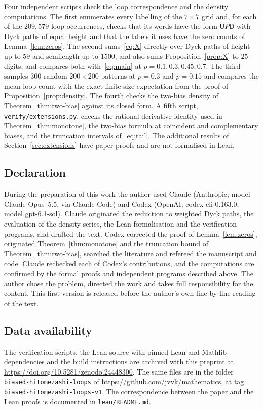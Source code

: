 \documentclass[11pt]{amsart}
\theoremstyle{definition}
\theoremstyle{remark}
\newcommand{\U}{\mathsf{U}}
\newcommand{\D}{\mathsf{D}}
\begin{document}
Four independent scripts check the loop correspondence and the density computations. The first
enumerates every labelling of the $7\times7$ grid and, for each of the $209{,}579$ loop occurrences,
checks that its words have the form $\U P\D$ with Dyck paths of equal height and that the labels it
uses have the zero counts of Lemma~\ref{lem:zeros}. The second sums~\eqref{eq:X} directly over Dyck paths
of height up to $59$ and semilength up to $1500$, and also sums Proposition~\ref{prop:X} to $25$ digits,
and compares both with~\eqref{eq:main} at $p=0.1,0.3,0.45,0.7$. The third samples $300$ random
$200\times200$ patterns at $p=0.3$ and $p=0.15$ and compares the mean loop count with the exact
finite-size expectation from the proof of Proposition~\ref{prop:density}. The fourth checks the
two-bias density of Theorem~\ref{thm:two-bias} against its closed form. A fifth script,
\texttt{verify/extensions.py}, checks the rational derivative identity used in
Theorem~\ref{thm:monotone}, the two-bias formula at coincident and complementary biases, and the
truncation intervals of~\eqref{eq:tail}. The additional results of Section~\ref{sec:extensions} have
paper proofs and are not formalised in Lean.

\subsection*{Declaration}
During the preparation of this work the author used Claude (Anthropic; model Claude Opus~5.5, via Claude
Code) and Codex (OpenAI; codex-cli 0.163.0, model gpt-6.1-sol). Claude originated the reduction to weighted
Dyck paths, the evaluation of the density series, the Lean formalisation and the verification programs, and
drafted the text. Codex corrected the proof of Lemma~\ref{lem:zeros}, originated Theorem~\ref{thm:monotone}
and the truncation bound of Theorem~\ref{thm:two-bias}, searched the literature and refereed the manuscript
and code. Claude rechecked each of Codex's contributions, and the computations are confirmed by the
formal proofs and independent programs described above. The author chose the problem, directed the work and takes full
responsibility for the content. This first version is released before the author's own line-by-line
reading of the text.

\subsection*{Data availability}
{\sloppy The verification scripts, the Lean source with pinned Lean and Mathlib dependencies and the build
instructions are archived with this preprint at \url{https://doi.org/10.5281/zenodo.24448300}. The same files
are in the folder \texttt{biased-hitomezashi-loops} of \url{https://github.com/jvvk/mathematics}, at tag
\texttt{biased-hitomezashi-loops-v1}. The correspondence between the paper and the Lean proofs is documented
in \texttt{lean/README.md}.\par}
\end{document}
